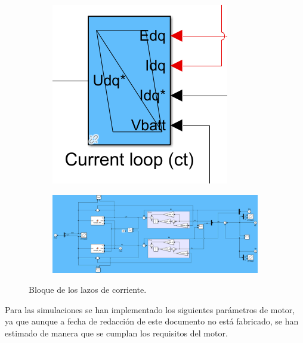 \begin{figure}[H]
    \begin{subfigure}{0.2\linewidth}
        \centering
        \includegraphics[width=\linewidth]{fig/PIEMR_out.png}
    \end{subfigure}
    \begin{subfigure}{0.75\linewidth}
        \centering
        \includegraphics[width=\linewidth]{fig/PIEMR_in.png}
    \end{subfigure}
    \caption{Bloque de los lazos de corriente.}
\end{figure}

Para las simulaciones se han implementado los siguientes parámetros de motor, ya que aunque a fecha de redacción de este documento no está fabricado, se han estimado de manera que se cumplan los requisitos del motor.


